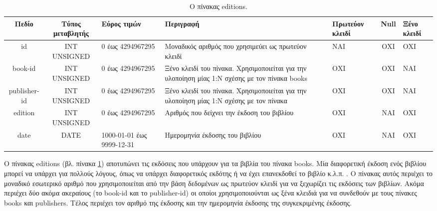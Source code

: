 \documentclass{assignment}
\begin{document}
\begin{landscape}
\begin{table}[htbp]
\begin{center}
  \begin{tabular}{|c|c|m{}|m{}|m{2.0cm}|c|m{1.5cm}|}
    \hline
    {\bf Πεδίο} & {\bf Τύπος μεταβλητής} & {\bf Εύρος τιμών} & {\bf Περιγραφή} & {\bf Πρωτεύον κλειδί} & {\bf Null} & {\bf Ξένο κλειδί} \\ \hline
    id & INT UNSIGNED & 0 έως 4294967295 & Μοναδικός αριθμός που χρησιμεύει ως πρωτεύον κλειδί & ΝΑΙ & ΟΧΙ & ΟΧΙ \\ \hline
    book-id & INT UNSIGNED & 0 έως 4294967295 & Ξένο κλειδί του πίνακα. Χρησιμοποιείται για την υλοποίηση μίας 1:N σχέσης με τον πίνακα books & ΟΧΙ & ΟΧΙ & NAI \\ \hline
    publisher-id & INT UNSIGNED & 0 έως 4294967295 & Ξένο κλειδί του πίνακα. Χρησιμοποιείται για την υλοποίηση μίας 1:N σχέσης με τον πίνακα  & ΟΧΙ & ΟΧΙ & NAI \\ \hline
    edition & INT UNSIGNED & 0 έως 4294967295 & Αριθμός που δείχνει την έκδοση του βιβλίου  & ΟΧΙ & ΝΑΙ & ΟΧΙ \\ \hline
    date & DATE & 1000-01-01 έως 9999-12-31 & Ημερομηνία έκδοσης του βιβλίου & OXI & ΝΑΙ & ΟΧΙ \\ \hline
  \end{tabular}
\caption{Ο πίνακας editions.}
\label{table:db_table:editions}
\end{center}
\end{table}

Ο πίνακας editions (βλ. πίνακα \ref{table:db_table:editions}) αποτυπώνει τις εκδόσεις που υπάρχουν για τα βιβλία του πίνακα books. Μία διαφορετική έκδοση ενός βιβλίου μπορεί να υπάρχει για πολλούς λόγους, όπως να υπάρχει διαφορετικός εκδότης ή να έχει επανεκδοθεί το βιβλίο κ.λ.π. . Ο πίνακας αυτός περιέχει το μοναδικό εσωτερικό αριθμό που χρησιμοποιείται από την βάση δεδομένων ως πρωτεύον κλειδί για να ξεχωρίζει τις εκδόσεις των βιβλίων. Ακόμα περιέχει δύο ακόμα ακεραίους (το book-id και το publisher-id) οι οποίοι χρησιμοποιούνται ως ξένα κλειδιά για να συνδεθούν με τους πίνακες books και publishers. Τέλος περιέχει τον αριθμό της έκδοσης και την ημερομηνία έκδοσης της συγκεκριμένης έκδοσης.
\end{landscape}
\end{document}
